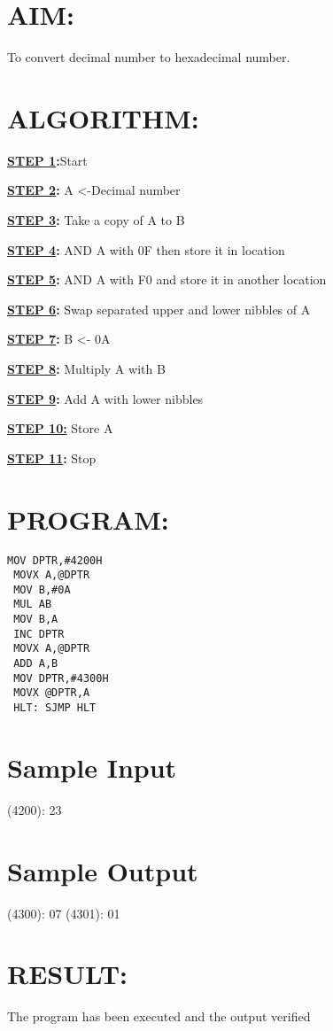 
%
%
%
%
\section*{AIM:}
To convert decimal number to hexadecimal number.

\section*{ALGORITHM:}
\textbf{\underline{STEP 1}:}Start

\textbf{\underline{STEP 2}:} A <-Decimal number

\textbf{\underline{STEP 3}:} Take a copy of A to B

\textbf{\underline{STEP 4}:} AND A with 0F then store it in location

\textbf{\underline{STEP 5}:} AND A with F0 and store it in another location

\textbf{\underline{STEP 6}:} Swap separated upper and lower nibbles of A

\textbf{\underline{STEP 7}:} B <- 0A

\textbf{\underline{STEP 8}:} Multiply A with B

\textbf{\underline{STEP 9}:} Add A with lower nibbles

\textbf{\underline{STEP 10:}} Store A

\textbf{\underline{STEP 11}:} Stop


\section*{PROGRAM:}

\begin{lstlisting}
MOV DPTR,#4200H 
 MOVX A,@DPTR  
 MOV B,#0A 
 MUL AB 
 MOV B,A 
 INC DPTR 
 MOVX A,@DPTR 
 ADD A,B 
 MOV DPTR,#4300H 
 MOVX @DPTR,A 
 HLT: SJMP HLT
\end{lstlisting}

\section*{Sample Input}
(4200): 23 

\section*{Sample Output}
(4300): 07 
(4301): 01 

\section*{RESULT:}
The program has been executed and the output verified
%
%
%
%
